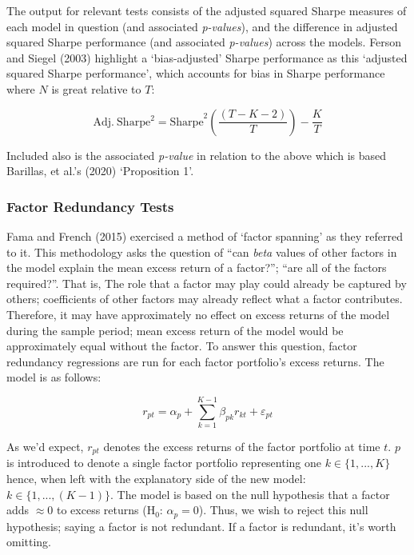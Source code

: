 \documentclass[11pt, english]{article}
\begin{document}
        The output for relevant tests consists of the adjusted squared Sharpe measures of each model in question (and associated \textit{p-values}), and the difference in adjusted squared Sharpe performance (and associated \textit{p-values}) across the models. Ferson and Siegel (2003) highlight a `bias-adjusted' Sharpe performance as this `adjusted squared Sharpe performance', which accounts for bias in Sharpe performance where $N$ is great relative to $T$:

	$$\mathrm{Adj.\ Sharpe^2=Sharpe}^2\left(\frac{(T-K-2)}{T}\right)-\frac{K}{T}$$

        Included also is the associated \textit{p-value} in relation to the above which is based Barillas, et al.’s (2020) `Proposition 1'.

                \subsubsection*{Factor Redundancy Tests}

        Fama and French (2015) exercised a method of `factor spanning' as they referred to it. This methodology asks the question of ``can \textit{beta} values of other factors in the model explain the mean excess return of a factor?''; ``are all of the factors required?''. That is, The role that a factor may play could already be captured by others; coefficients of other factors may already reflect what a factor contributes. Therefore, it may have approximately no effect on excess returns of the model during the sample period; mean excess return of the model would be approximately equal without the factor. To answer this question, factor redundancy regressions are run for each factor portfolio's excess returns. The model is as follows:

        $$r_{pt}=\alpha_p+\sum_{k=1}^{K-1}\beta_{pk}r_{kt}+\varepsilon_{pt}$$

        As we'd expect, $r_{pt}$ denotes the excess returns of the factor portfolio at time $t$. $p$ is introduced to denote a single factor portfolio representing one $k\in\{1,...,K\}$ hence, when left with the explanatory side of the new model: $k\in\{1,...,(K-1)\}$. The model is based on the null hypothesis that a factor adds $\approx0$ to excess returns (H$_0$: $\alpha_p=0$). Thus, we wish to reject this null hypothesis; saying a factor is not redundant. If a factor is redundant, it's worth omitting.\\
\end{document}
